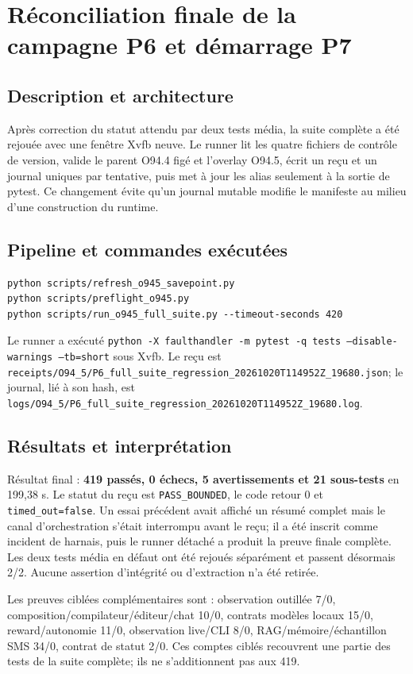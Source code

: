 \documentclass[11pt,a4paper]{article}
\begin{document}
\section{Réconciliation finale de la campagne P6 et démarrage P7}
\subsection{Description et architecture}
Après correction du statut attendu par deux tests média, la suite complète a été rejouée avec une fenêtre Xvfb neuve. Le runner lit les quatre fichiers de contrôle de version, valide le parent O94.4 figé et l'overlay O94.5, écrit un reçu et un journal uniques par tentative, puis met à jour les alias seulement à la sortie de pytest. Ce changement évite qu'un journal mutable modifie le manifeste au milieu d’une construction du runtime.

\subsection{Pipeline et commandes exécutées}
\begin{verbatim}
python scripts/refresh_o945_savepoint.py
python scripts/preflight_o945.py
python scripts/run_o945_full_suite.py --timeout-seconds 420
\end{verbatim}
Le runner a exécuté \texttt{python -X faulthandler -m pytest -q tests --disable-warnings --tb=short} sous Xvfb. Le reçu est \texttt{receipts/O94\_5/P6\_full\_suite\_regression\_20261020T114952Z\_19680.json}; le journal, lié à son hash, est \texttt{logs/O94\_5/P6\_full\_suite\_regression\_20261020T114952Z\_19680.log}.

\subsection{Résultats et interprétation}
Résultat final : \textbf{419 passés, 0 échecs, 5 avertissements et 21 sous-tests} en 199,38 s. Le statut du reçu est \texttt{PASS\_BOUNDED}, le code retour 0 et \texttt{timed\_out=false}. Un essai précédent avait affiché un résumé complet mais le canal d'orchestration s'était interrompu avant le reçu; il a été inscrit comme incident de harnais, puis le runner détaché a produit la preuve finale complète. Les deux tests média en défaut ont été rejoués séparément et passent désormais 2/2. Aucune assertion d'intégrité ou d'extraction n’a été retirée.

Les preuves ciblées complémentaires sont : observation outillée 7/0, composition/compilateur/éditeur/chat 10/0, contrats modèles locaux 15/0, reward/autonomie 11/0, observation live/CLI 8/0, RAG/mémoire/échantillon SMS 34/0, contrat de statut 2/0. Ces comptes ciblés recouvrent une partie des tests de la suite complète; ils ne s'additionnent pas aux 419.
\end{document}

